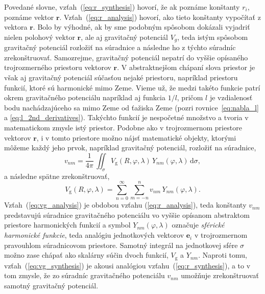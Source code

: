 \documentclass[a4paper, 12pt]{book}
\newcommand{\diff}{\mathrm d}
\newcommand{\gidx}{\mathrm g}
\let\vec\mathbf
\begin{document}
Povedané slovne, vzťah~(\ref{eq:r_synthesis}) hovorí, že ak poznáme konštanty 
$r_i$, poznáme vektor $\vec r$.  Vzťah~(\ref{eq:r_analysis}) hovorí, ako tieto 
konštanty vypočítať z vektora $\vec r$.  Bolo by výhodné, ak by sme podobným 
spôsobom dokázali vyjadriť nielen polohový vektor $\vec r$, ale aj gravitačný 
potenciál $V_g$, teda istým spôsobom gravitačný potenciál rozložiť na súradnice 
a následne ho z týchto súradníc zrekonštruovať.  Samozrejme, gravitačný 
potenciál nepatrí do vyššie opísaného trojrozmerného priestoru vektorov $\vec 
r$.  V abstraktnejšom chápaní slova priestor je však aj gravitačný potenciál 
súčasťou nejaké priestoru, napríklad priestoru funkcií, ktoré sú harmonické 
mimo Zeme.  Vieme už, že medzi takéto funkcie patrí okrem gravitačného 
potenciálu napríklad aj funkcia $1 \slash l$, pričom $l$ je vzdialenosť bodu 
nachádzajúceho sa mimo Zeme od ťažiska Zeme (pozri rovnice~\ref{eq:nabla_l} 
a \ref{eq:l_2nd_derivatives}).  Takýchto funkcií je nespočetné množstvo 
a tvoria v matematickom zmysle istý priestor.  Podobne ako v trojrozmernom 
priestore vektorov $\vec r$, i v tomto priestore možno nájsť matematické 
objekty, ktorými môžeme každý jeho prvok, napríklad gravitačný potenciál, 
rozložiť na súradnice,
%
\begin{equation}
\label{eq:vg_analysis}
v_{nm} = \frac{1}{4\pi} \, \iint_{\sigma} V_\gidx(R, \varphi, \lambda) \, 
Y_{nm}(\varphi, \lambda) \, \diff \sigma{,}
\end{equation}
%
a následne spätne zrekonštruovať,
%
\begin{equation}
\label{eq:vg_synthesis}
V_\gidx(R, \varphi, \lambda) = \sum_{n = 0}^{\infty} \sum_{m = -n}^{n} v_{nm} 
\, Y_{nm}(\varphi, \lambda){.}
\end{equation}
%
Vzťah~(\ref{eq:vg_analysis}) je obdobou vzťahu (\ref{eq:r_analysis}), teda 
konštanty $v_{nm}$ predstavujú súradnice gravitačného potenciálu vo vyššie 
opísanom abstraktom priestore harmonických funkcií a symbol $Y_{nm}(\varphi, 
\lambda)$ označuje \emph{sférické harmonické funkcie}, teda analógiu 
jednotkových vektorov $\vec e_i$ v trojrozmernom pravouhlom súradnicovom 
priestore.  Samotný integrál na jednotkovej sfére $\sigma$ možno zase chápať 
ako skalárny súčin dvoch funkcií, $V_\gidx$ a $Y_{nm}$.  Naproti tomu, 
vzťah~(\ref{eq:vg_synthesis}) je akousi analógiou 
vzťahu~(\ref{eq:r_synthesis}), a to v tom zmysle, že zo súradníc gravitačného 
potenciálu $v_{nm}$ umožňuje zrekonštruovať samotný gravitačný potenciál.
\end{document}
